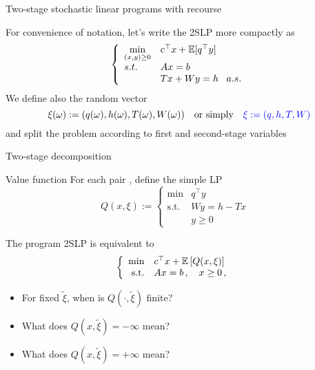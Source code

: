 \begin{frame}{Two-stage stochastic linear programs with recourse}

\begin{center}
\end{center}

\begin{center}
\end{center}

For convenience of notation, let's
write the 2SLP more compactly as
\[
\left\{\begin{array}{ll}
\displaystyle \min_{(x,y)\geq 0} & c^\top x+
\mathbb{E}[q^\top y]\\
 s.t. & Ax =  b \\&T x+Wy=h \;\;\; a.s.
\end{array}\right.
\]
We define also the random vector
\[
\xi(\omega): = (q(\omega),h(\omega),T(\omega),W(\omega))
\quad \mbox{or simply} \quad
{\color{blue}\xi: = (q,h,T,W)}
\]
and split the problem according to first and second-stage variables

\end{frame}



\begin{frame}{Two-stage decomposition}
  \begin{block}{Value function}
    For each pair , define the simple LP
    \[Q(x,\xi):=\left\{ \begin{array}{rll}
        \min & q^\top y &\\
        \mbox{s.t.} & W y   =h-Tx&\\
                    & y  \geq 0  &
    \end{array} \right.\]
  \end{block}
The program 2SLP is equivalent to
\[\left\{ \begin{array}{rll}
\min & c^\top x +\mathbb{E}\left[Q(x,\xi)\right] &\\
\mbox{s.t.} & Ax=b\,, \quad x\geq0\,,&
\end{array} \right.\]

\begin{itemize}
\item For fixed $\tilde\xi$, when is $Q(\cdot,\tilde\xi)$ finite?
\item What does $Q(x,\tilde\xi)=-\infty$ mean?
\item What does $Q(x,\tilde\xi)=+\infty$ mean?
\end{itemize}



\end{frame}

